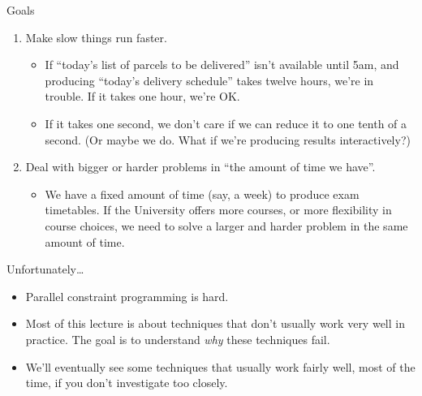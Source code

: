\documentclass{beamer}
\begin{document}
\begin{frame}{Goals}
    \begin{enumerate}
        \item Make slow things run faster.
            \begin{itemize}
                \item If ``today's list of parcels to be delivered'' isn't available until 5am, and
                    producing ``today's delivery schedule'' takes twelve hours, we're in trouble. If
                    it takes one hour, we're OK.

                \item If it takes one second, we don't care if we can reduce it to one tenth of a
                    second. (Or maybe we do. What if we're producing results interactively?)
            \end{itemize}

        \item Deal with bigger or harder problems in ``the amount of time we have''.
            \begin{itemize}
                \item We have a fixed amount of time (say, a week) to produce exam timetables. If
                    the University offers more courses, or more flexibility in course choices, we
                    need to solve a larger and harder problem in the same amount of time.
            \end{itemize}
    \end{enumerate}
\end{frame}

\begin{frame}{Unfortunately\ldots}
    \begin{itemize}
        \item Parallel constraint programming is hard.
        \item Most of this lecture is about techniques that don't usually work very well in
            practice. The goal is to understand \emph{why} these techniques fail.
        \item We'll eventually see some techniques that usually work fairly well, most of the time,
            if you don't investigate too closely.
    \end{itemize}
\end{frame}
\end{document}
